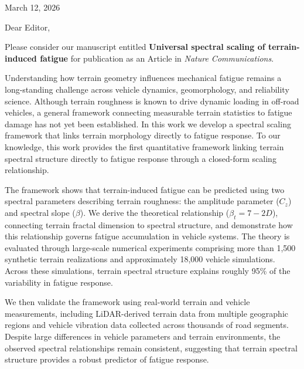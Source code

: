 \documentclass[11pt]{article}
\begin{document}
\noindent
March 12, 2026

\vspace{0.7cm}

\noindent
Dear Editor,

\vspace{0.4cm}

\noindent
Please consider our manuscript entitled \textbf{Universal spectral scaling of terrain-induced fatigue} for publication as an Article in \textit{Nature Communications}.

\vspace{0.4cm}

\noindent
Understanding how terrain geometry influences mechanical fatigue remains a long-standing challenge across vehicle dynamics, geomorphology, and reliability science. Although terrain roughness is known to drive dynamic loading in off-road vehicles, a general framework connecting measurable terrain statistics to fatigue damage has not yet been established. In this work we develop a spectral scaling framework that links terrain morphology directly to fatigue response. To our knowledge, this work provides the first quantitative framework linking terrain spectral structure directly to fatigue response through a closed-form scaling relationship.

\vspace{0.4cm}

\noindent
The framework shows that terrain-induced fatigue can be predicted using two spectral parameters describing terrain roughness: the amplitude parameter ($C_z$) and spectral slope ($\beta$). We derive the theoretical relationship ($\beta_t = 7 - 2D$), connecting terrain fractal dimension to spectral structure, and demonstrate how this relationship governs fatigue accumulation in vehicle systems. The theory is evaluated through large-scale numerical experiments comprising more than 1,500 synthetic terrain realizations and approximately 18,000 vehicle simulations. Across these simulations, terrain spectral structure explains roughly 95\% of the variability in fatigue response.

\vspace{0.4cm}

\noindent
We then validate the framework using real-world terrain and vehicle measurements, including LiDAR-derived terrain data from multiple geographic regions and vehicle vibration data collected across thousands of road segments. Despite large differences in vehicle parameters and terrain environments, the observed spectral relationships remain consistent, suggesting that terrain spectral structure provides a robust predictor of fatigue response.
\end{document}
